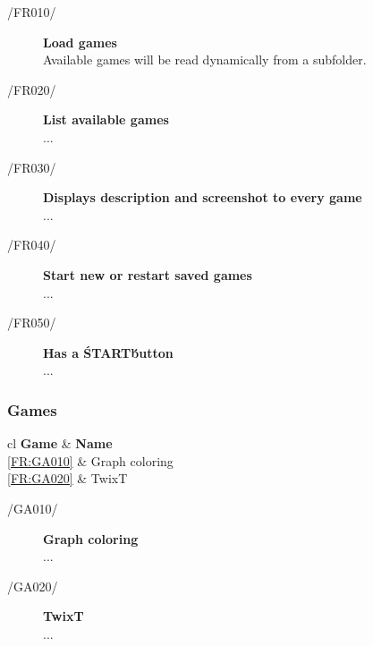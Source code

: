 \vspace{1cm}

\begin{description}
  	\item[/FR010/\label{FR:GE010}] {\bf Load games}  \hfill \\
  	Available games will be read dynamically from a subfolder.
 	\item[/FR020/\label{FR:GE020}] {\bf List available games}  \\
 	...
	\item[/FR030/\label{FR:GE030}] {\bf Displays description and screenshot to every game}  \\
  	...
	\item[/FR040/\label{FR:GE040}] {\bf Start new or restart saved games}  \\
	...
	\item[/FR050/\label{FR:GE050}] {\bf Has a \'START\' button}  \\
	...
\end{description}

\subsubsection{Games}
\begin{tabular}{{c}{l}}
    \hline
    {\bf Game} & {\bf Name} \\ \hline
	\ref{FR:GA010} & Graph coloring \\
	\ref{FR:GA020} & TwixT \\
\end{tabular}

\vspace{1cm}

\begin{description}
  	\item[/GA010/\label{FR:GA010}] {\bf Graph coloring}  \hfill \\
  	...
 	\item[/GA020/\label{FR:GA020}] {\bf TwixT}  \\
 	...
\end{description}